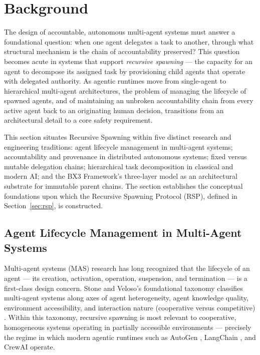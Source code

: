 \section{Background}
\label{sec:background}

The design of accountable, autonomous multi-agent systems must answer a foundational question: when one agent delegates a task to another, through what structural mechanism is the chain of accountability preserved? This question becomes acute in systems that support \emph{recursive spawning} — the capacity for an agent to decompose its assigned task by provisioning child agents that operate with delegated authority. As agentic runtimes move from single-agent to hierarchical multi-agent architectures, the problem of managing the lifecycle of spawned agents, and of maintaining an unbroken accountability chain from every active agent back to an originating human decision, transitions from an architectural detail to a core safety requirement.

This section situates Recursive Spawning within five distinct research and engineering traditions: agent lifecycle management in multi-agent systems; accountability and provenance in distributed autonomous systems; fixed versus mutable delegation chains; hierarchical task decomposition in classical and modern AI; and the BX3 Framework's three-layer model as an architectural substrate for immutable parent chains. The section establishes the conceptual foundations upon which the Recursive Spawning Protocol (RSP), defined in Section~\ref{sec:rsp}, is constructed.

\subsection{Agent Lifecycle Management in Multi-Agent Systems}

Multi-agent systems (MAS) research has long recognized that the lifecycle of an agent — its creation, activation, operation, suspension, and termination — is a first-class design concern. Stone and Veloso's foundational taxonomy classifies multi-agent systems along axes of agent heterogeneity, agent knowledge quality, environment accessibility, and interaction nature (cooperative versus competitive) \cite{stone2000}. Within this taxonomy, recursive spawning is most relevant to cooperative, homogeneous systems operating in partially accessible environments — precisely the regime in which modern agentic runtimes such as AutoGen \cite{autogen2023}, LangChain \cite{langchain2023}, and CrewAI \cite{crewai2024} operate.


